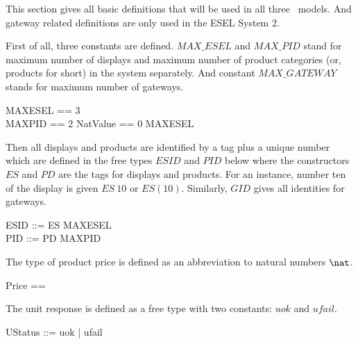 
This section gives all basic definitions that will be used in all three \Circus\ models. And gateway related definitions are only used in the ESEL System 2.

First of all, three constants are defined. $MAX\_ESEL$ and $MAX\_PID$ stand for maximum number of displays and maximum number of product categories (or, products for short) in the system separately. And constant $MAX\_GATEWAY$ stands for maximum number of gateways.
\begin{zed}
    MAXESEL == 3 \\
\also    MAXPID == 2
\also    NatValue ==  0 \upto MAXESEL  \\
\end{zed}

Then all displays and products are identified by a tag plus a unique number which are defined in the free types $ESID$ and $PID$ below where the constructors $ES$ and $PD$ are the tags for displays and products. For an instance, number ten of the display is given $ES~10$ or $ES(10)$. Similarly, $GID$ gives all identities for gateways.
\begin{zed}
    ESID ::= ES  \upto MAXESEL \rdata \\
    PID ::= PD  \upto MAXPID \rdata \\
\end{zed}


The type of product price is defined as an abbreviation to natural numbers $\nat$.
\begin{zed}
    Price == \nat
\end{zed}

The unit response is defined as a free type with two constants: $uok$ and $ufail$.
\begin{zed}
    UStatus ::= uok | ufail
\end{zed}

